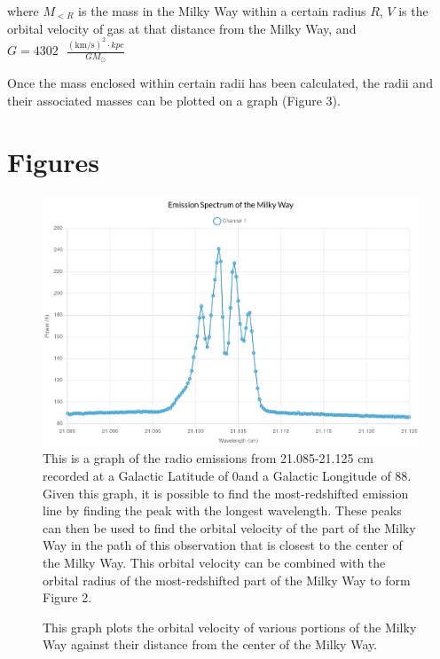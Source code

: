 \documentclass{article}
\begin{document}
where $M_{<R}$ is the mass in the Milky Way within a certain radius $R$, $V$ is the orbital velocity of gas at that distance from the Milky Way, and $G=4302\text{ }\frac{(\text{km/s})^2 \cdot kpc}{GM_{\odot}}$

Once the mass enclosed within certain radii has been calculated, the radii and their associated masses can be plotted on a graph (Figure 3).

\pagebreak

\section{Figures}
\begin{center}
    \begin{figure}[h!]
        \caption{
            This is a graph of the radio emissions from 21.085-21.125 cm recorded at a Galactic Latitude of 0\degree \space and a Galactic Longitude of 88\degree \space.
            Given this graph, it is possible to find the most-redshifted emission line by finding the peak with the longest wavelength.
            These peaks can then be used to find the orbital velocity of the part of the Milky Way in the path of this observation that is closest to the center of the Milky Way.
            This orbital velocity can be combined with the orbital radius of the most-redshifted part of the Milky Way to form Figure 2.
            \smallskip
        }
        \includegraphics[scale=0.2]{emission-graph-lab9.jpg}
        \centering
    \end{figure}
    \begin{figure}[h!]
        \caption{
            This graph plots the orbital velocity of various portions of the Milky Way against their distance from the center of the Milky Way.
}
\end{figure}
\end{center}
\end{document}
